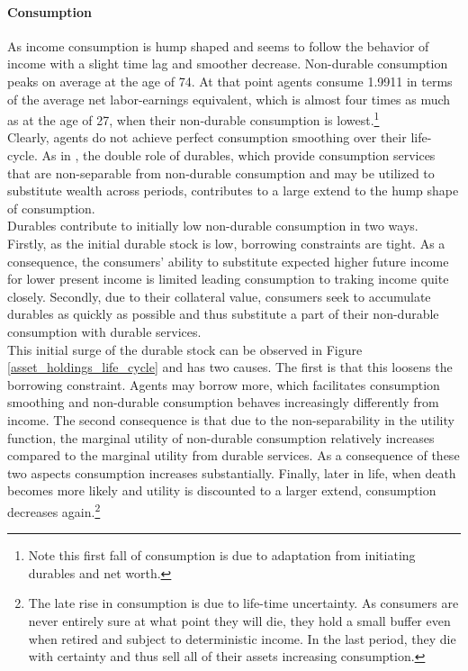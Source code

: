 \documentclass[a4paper,12pt,legno]{article}
\begin{document}
\paragraph{Consumption} As income consumption is hump shaped and seems to follow the behavior of income with a slight time lag and smoother decrease. Non-durable consumption peaks on average at the age of 74. At that point agents consume 1.9911 in terms of the average net labor-earnings equivalent, which is almost four times as much as at the age of 27, when their non-durable consumption is lowest.\footnote{Note this first fall of consumption is due to adaptation from initiating durables and net worth.} \\
Clearly, agents do not achieve perfect consumption smoothing over their life-cycle. As in \cite{FV&K2011}, the double role of durables, which provide consumption services that are non-separable from non-durable consumption and may be utilized to substitute wealth across periods, contributes to a large extend to the hump shape of consumption.\\
Durables contribute to initially low non-durable consumption in two ways. Firstly, as the initial durable stock is low, borrowing constraints are tight. As a consequence, the consumers' ability to substitute expected higher future income for lower present income is limited leading consumption to traking income quite closely. Secondly, 
due to their collateral value, consumers seek to accumulate durables as quickly as possible and thus substitute a part of their non-durable consumption with durable services. \\
This initial surge of the durable stock can be observed in Figure \ref{asset_holdings_life_cycle} and has two causes. The first is that this loosens the borrowing constraint. Agents may borrow more, which facilitates consumption smoothing and non-durable consumption behaves increasingly differently from income. The second consequence is that due to the non-separability in the utility function, the marginal utility of non-durable consumption relatively increases compared to the marginal utility from durable services. As a consequence of these two aspects consumption increases substantially. 
Finally, later in life, when death becomes more likely and utility is discounted to a larger extend, consumption decreases again.\footnote{The late rise in consumption is due to life-time uncertainty. As consumers are never entirely sure at what point they will die, they hold a small buffer even when retired and subject to deterministic income. In the last period, they die with certainty and thus sell all of their assets increasing consumption.} 
\end{document}
